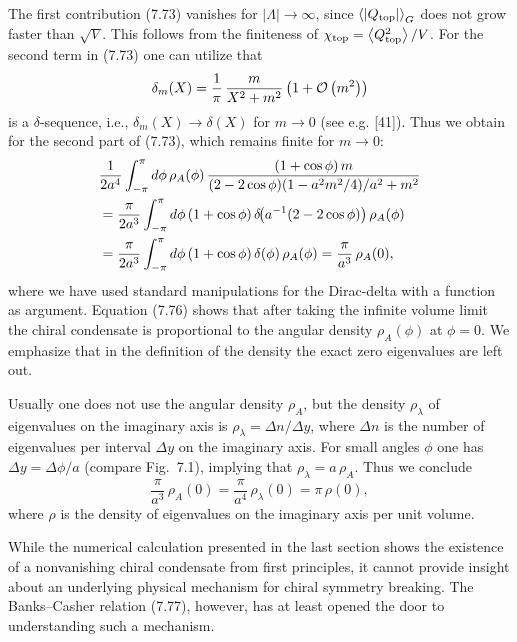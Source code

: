The first contribution (7.73) vanishes for $|\Lambda| \to \infty$, since
$\left\langle |Q_{\mathrm{top}}| \right\rangle_G$ does not grow faster than $\sqrt{V}$. This follows
from the finiteness of $\chi_{\mathrm{top}} = \left\langle Q^2_{\mathrm{top}} \right\rangle/V$.
For the second term in (7.73) one can utilize that
\begin{equation}
  \delta_m(X) = \frac{1}{\pi}\,\frac{m}{X^2 + m^2}\left(1 + \mathcal{O}\left(m^2\right)\right)
\end{equation}
is a $\delta$-sequence, i.e., $\delta_m(X) \to \delta(X)$ for $m \to 0$ (see
e.g. [41]). Thus we obtain for the second part of (7.73), which remains finite
for $m \to 0$:
\begin{align}
  &\frac{1}{2a^4}\int_{-\pi}^{\pi}d\phi\,\rho_A(\phi)\,
    \frac{(1+\cos\phi)\,m}{(2-2\cos\phi)(1-a^2m^2/4)/a^2 + m^2} \notag\\
  &= \frac{\pi}{2a^3}\int_{-\pi}^{\pi}d\phi\,(1+\cos\phi)\,
     \delta\!\bigl(a^{-1}(2-2\cos\phi)\bigr)\,\rho_A(\phi) \notag\\
  &= \frac{\pi}{2a^3}\int_{-\pi}^{\pi}d\phi\,(1+\cos\phi)\,
     \delta(\phi)\,\rho_A(\phi) = \frac{\pi}{a^3}\,\rho_A(0),
\end{align}
where we have used standard manipulations for the Dirac-delta with a function
as argument. Equation (7.76) shows that after taking the infinite volume limit
the chiral condensate is proportional to the angular density $\rho_A(\phi)$ at
$\phi = 0$. We emphasize that in the definition of the density the exact zero
eigenvalues are left out.

Usually one does not use the angular density $\rho_A$, but the density
$\rho_\lambda$ of eigenvalues on the imaginary axis is
$\rho_\lambda = \Delta n/\Delta y$, where $\Delta n$ is the number of
eigenvalues per interval $\Delta y$ on the imaginary axis. For small angles
$\phi$ one has $\Delta y = \Delta\phi/a$ (compare Fig.~7.1), implying that
$\rho_\lambda = a\,\rho_A$. Thus we conclude
\begin{equation}
  \frac{\pi}{a^3}\,\rho_A(0) = \frac{\pi}{a^4}\,\rho_\lambda(0)
  = \pi\,\rho(0),
\end{equation}
where $\rho$ is the density of eigenvalues on the imaginary axis per unit
volume.

While the numerical calculation presented in the last section shows the
existence of a nonvanishing chiral condensate from first principles, it cannot
provide insight about an underlying physical mechanism for chiral symmetry
breaking. The Banks--Casher relation (7.77), however, has at least opened the
door to understanding such a mechanism.

